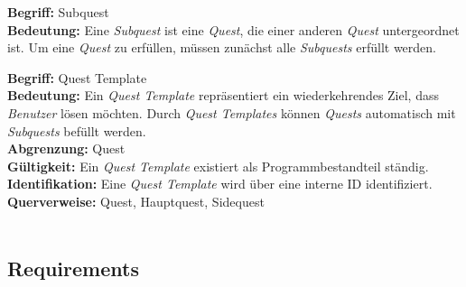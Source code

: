 \documentclass{article}
\begin{document}
\begin{samepage}
\textbf{Begriff:} Subquest \\
\textbf{Bedeutung:} Eine \textit{Subquest} ist eine \textit{Quest}, die einer anderen \textit{Quest} untergeordnet ist. Um eine \textit{Quest} zu erfüllen, müssen zunächst alle \textit{Subquests} erfüllt werden. \\
\end{samepage}

\begin{samepage}
\textbf{Begriff:} Quest Template \\
\textbf{Bedeutung:} Ein \textit{Quest Template} repräsentiert ein wiederkehrendes Ziel, dass \textit{Benutzer} lösen möchten. Durch \textit{Quest Templates} können \textit{Quests} automatisch mit \textit{Subquests} befüllt werden. \\
\textbf{Abgrenzung:} Quest \\
\textbf{Gültigkeit:} Ein \textit{Quest Template} existiert als Programmbestandteil ständig. \\
\textbf{Identifikation:} Eine \textit{Quest Template} wird über eine interne ID identifiziert. \\
\textbf{Querverweise:} Quest, Hauptquest, Sidequest \\ \\
\end{samepage}

\subsection{Requirements}
\end{document}
